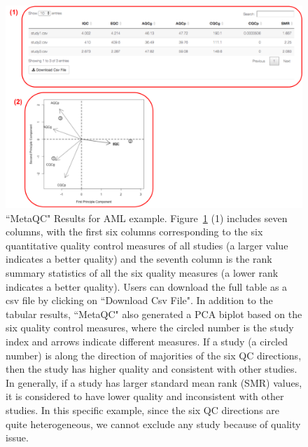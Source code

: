 \begin{figure}[H]
\begin{center}
\includegraphics[scale=0.65]{./figure/metaQC/metaQCresult_AML.pdf}
\caption{``MetaQC" Results for AML example.
Figure~\ref{fig:MetaQCresult_AML} {\color{red} (1)} includes seven columns, 
with the first six columns corresponding to the six quantitative quality control measures of all studies (a larger value indicates a better quality) and the seventh column is the rank summary statistics of all the six quality measures (a lower rank indicates a better quality). 
Users can download the full table as a csv file by clicking on ``Download Csv File". 
In addition to the tabular results, ``MetaQC" also generated a PCA biplot based on the six quality control measures, 
where the circled number is the study index and arrows indicate different measures. 
If a study (a circled number) is along the direction of majorities of the six QC directions, then the study has higher quality and consistent with other studies.
In generally, if a study has larger standard mean rank (SMR) values, 
it is considered to have lower quality and inconsistent with other studies.
In this specific example, since the six QC directions are quite heterogeneous, 
we cannot exclude any study because of quality issue.
}
\label{fig:MetaQCresult_AML}
\end{center}
\end{figure}


